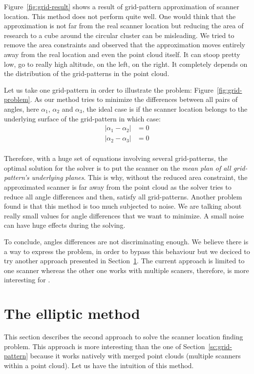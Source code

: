 Figure~\ref{fig:grid-result} shows a result of grid-pattern approximation of scanner location. This method does not perform quite well. One would think that the approximation is not far from the real scanner location but reducing the area of research to a cube around the circular cluster can be misleading. We tried to remove the area constraints and observed that the approximation moves entirely away from the real location and even the point cloud itself. It can stoop pretty low, go to really
high altitude, on the left, on the right. It completely depends on the distribution of the grid-patterns in the point cloud.

Let us take one grid-pattern in order to illustrate the problem: Figure~\ref{fig:grid-problem}. As our method tries to minimize the differences between all pairs of angles, here $\alpha_1$, $\alpha_2$ and $\alpha_3$, the ideal case is if the scanner location belongs to the underlying surface of the grid-pattern in which case:
\begin{align*}
  |\alpha_1 - \alpha_2| &= 0\\
  |\alpha_2 - \alpha_3| &= 0\\
\end{align*}

Therefore, with a huge set of equations involving several grid-patterns, the optimal solution for
the solver is to put the scanner on the \emph{mean plan of all grid-pattern's underlying planes}. This is why, without the reduced area constraint, the approximated scanner is far away from the point cloud as the solver tries to reduce all angle differences and then, satisfy all grid-patterns. Another problem found is that this method is too much subjected to noise. We are talking about really small values for angle differences that we want to minimize. A small noise can have
huge effects during the solving.

To conclude, angles differences are not discriminating enough. We believe there is a way to express the problem, in order to bypass this behaviour but we deciced to try another approach presented in Section~\ref{sc:elliptic}. The current approach is limited to one scanner whereas the other one works with multiple scaners, therefore, is more interesting for \CC.


\section{The elliptic method}
\label{sc:elliptic}
This section describes the second approach to solve the scanner location finding problem. This approach is more interesting than the one of Section~\ref{sc:grid-pattern} because it works natively with merged point clouds (multiple scanners within a point cloud). Let us have the intuition of this method.

